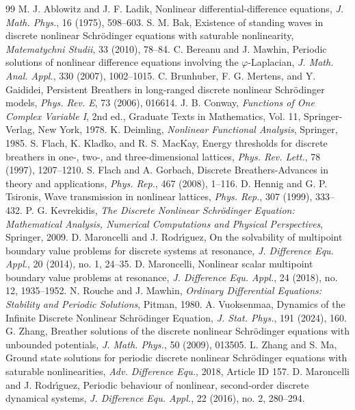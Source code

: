 \documentclass[10pt,a4paper]{amsart}
\renewcommand{\phi}{\varphi}
\numberwithin{equation}{section}
\begin{document}
\begin{thebibliography}{99}
 M. J. Ablowitz and J. F. Ladik, Nonlinear differential-difference equations, \emph{J. Math. Phys.}, 16 (1975), 598--603.
 S. M. Bak, Existence of standing waves in discrete nonlinear Schr\"odinger equations with saturable nonlinearity, \emph{Matematychni Studii}, 33 (2010), 78--84.
 C. Bereanu and J. Mawhin, Periodic solutions of nonlinear difference equations involving the $\phi$-Laplacian, \emph{J. Math. Anal. Appl.}, 330 (2007), 1002--1015.
 C. Brunhuber, F. G. Mertens, and Y. Gaididei, Persistent Breathers in long-ranged discrete nonlinear Schr\"odinger models, \emph{Phys. Rev. E}, 73 (2006), 016614.
 J. B. Conway, \emph{Functions of One Complex Variable I}, 2nd ed., Graduate Texts in Mathematics, Vol. 11, Springer-Verlag, New York, 1978.
 K. Deimling, \emph{Nonlinear Functional Analysis}, Springer, 1985.
 S. Flach, K. Kladko, and R. S. MacKay, Energy thresholds for discrete breathers in one-, two-, and three-dimensional lattices, \emph{Phys. Rev. Lett.}, 78 (1997), 1207--1210. %
 S. Flach and A. Gorbach, Discrete Breathers-Advances in theory and applications, \emph{Phys. Rep.}, 467 (2008), 1--116.
 D. Hennig and G. P. Tsironis, Wave transmission in nonlinear lattices, \emph{Phys. Rep.}, 307 (1999), 333--432.
 P. G. Kevrekidis, \emph{The Discrete Nonlinear Schr\"odinger Equation: Mathematical Analysis, Numerical Computations and Physical Perspectives}, Springer, 2009.
 D. Maroncelli and J. Rodr\'{\i}guez, On the solvability of multipoint boundary value problems for discrete systems at resonance, \emph{J. Difference Equ. Appl.}, 20 (2014), no. 1, 24--35.
 D. Maroncelli, Nonlinear scalar multipoint boundary value problems at resonance, \emph{J. Difference Equ. Appl.}, 24 (2018), no. 12, 1935--1952.
 N. Rouche and J. Mawhin, \emph{Ordinary Differential Equations: Stability and Periodic Solutions}, Pitman, 1980.
 A. Vuoksenmaa, Dynamics of the Infinite Discrete Nonlinear Schr\"odinger Equation, \emph{J. Stat. Phys.}, 191 (2024), 160.
 G. Zhang, Breather solutions of the discrete nonlinear Schr\"odinger equations with unbounded potentials, \emph{J. Math. Phys.}, 50 (2009), 013505.
 L. Zhang and S. Ma, Ground state solutions for periodic discrete nonlinear Schr\"odinger equations with saturable nonlinearities, \emph{Adv. Difference Equ.}, 2018, Article ID 157.
 D. Maroncelli and J. Rodr\'{\i}guez, Periodic behaviour of nonlinear, second-order discrete dynamical systems, \emph{J. Difference Equ. Appl.}, 22 (2016), no. 2, 280--294.
\end{thebibliography}
\end{document}
